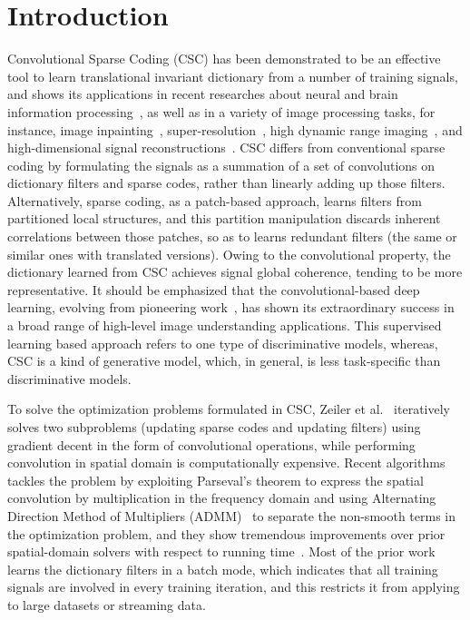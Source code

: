 \section{Introduction}
Convolutional Sparse Coding (CSC) has been demonstrated to be an effective tool to learn translational invariant dictionary from a number of training signals, and shows its applications in recent researches about neural and brain information processing~\cite{jas2017learning,peter2017sparse}, as well as in a variety of image processing tasks, for instance, image inpainting~\cite{heide2015fast}, super-resolution~\cite{gu2015convolutional}, high dynamic range imaging~\cite{serrano2016convolutional}, and high-dimensional signal reconstructions~\cite{choudhury2017consensus,bibi2017high}. CSC differs from conventional sparse coding by formulating the signals as a summation of a set of convolutions on dictionary filters and sparse codes, rather than linearly adding up those filters. Alternatively, sparse coding, as a patch-based approach, learns filters from partitioned local structures, and this partition manipulation discards inherent correlations between those patches, so as to learns redundant filters (the same or similar ones with translated versions). Owing to the convolutional property, the dictionary learned from CSC achieves signal global coherence, tending to be more representative. It should be emphasized that the convolutional-based deep learning, evolving from pioneering work~\cite{lecun1998gradient,kavukcuoglu2010learning,krizhevsky2012imagenet}, has shown its extraordinary success in a broad range of high-level image understanding applications. This supervised learning based approach refers to one type of discriminative models, whereas, CSC is a kind of generative model, which, in general, is less task-specific than discriminative models.

To solve the optimization problems formulated in CSC, Zeiler et al.~\cite{zeiler2010deconvolutional} iteratively solves two subproblems (updating sparse codes and updating filters) using gradient decent in the form of convolutional operations, while performing convolution in spatial domain is computationally expensive. Recent algorithms tackles the problem by exploiting Parseval's theorem to express the spatial convolution by multiplication in the frequency domain and using Alternating Direction Method of Multipliers (ADMM)~\cite{boyd2011distributed} to separate the non-smooth terms in the optimization problem, and they show tremendous improvements over prior spatial-domain solvers with respect to running time~\cite{bristow2013fast,heide2015fast,wohlberg2016efficient}. Most of the prior work learns the dictionary filters in a batch mode, which indicates that all training signals are involved in every training iteration, and this restricts it from applying to large datasets or streaming data.


